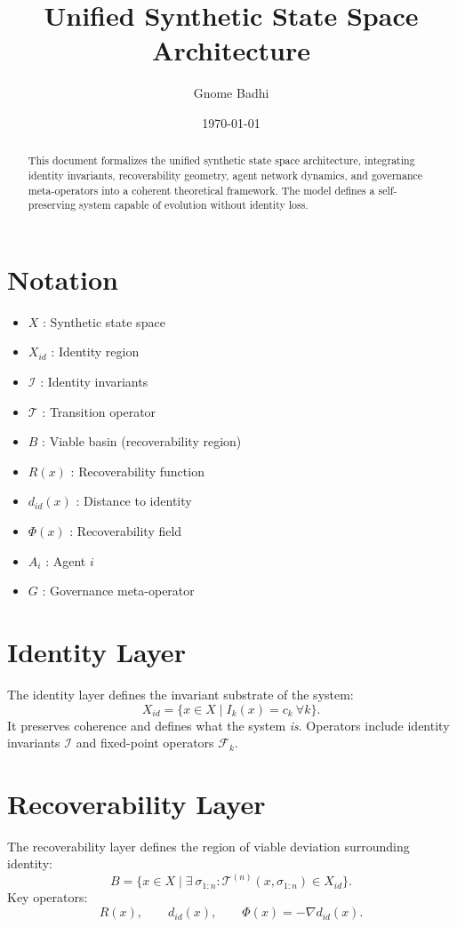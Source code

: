 \documentclass[12pt]{article}
\title{Unified Synthetic State Space Architecture}
\author{Gnome Badhi}
\date{\today}
\begin{document}
\maketitle

\begin{abstract}
This document formalizes the unified synthetic state space architecture, integrating identity invariants, recoverability geometry, agent network dynamics, and governance meta-operators into a coherent theoretical framework. The model defines a self-preserving system capable of evolution without identity loss.
\end{abstract}

\tableofcontents

\section{Notation}
\begin{itemize}
    \item $X$ : Synthetic state space
    \item $X_{id}$ : Identity region
    \item $\mathcal{I}$ : Identity invariants
    \item $\mathcal{T}$ : Transition operator
    \item $B$ : Viable basin (recoverability region)
    \item $R(x)$ : Recoverability function
    \item $d_{id}(x)$ : Distance to identity
    \item $\Phi(x)$ : Recoverability field
    \item $A_i$ : Agent $i$
    \item $G$ : Governance meta-operator
\end{itemize}

\section{Identity Layer}
The identity layer defines the invariant substrate of the system:
\[
X_{id} = \{x \in X \mid I_k(x) = c_k \ \forall k\}.
\]
It preserves coherence and defines what the system \emph{is}. Operators include identity invariants $\mathcal{I}$ and fixed-point operators $\mathcal{F}_k$.

\section{Recoverability Layer}
The recoverability layer defines the region of viable deviation surrounding identity:
\[
B = \{x \in X \mid \exists \ \sigma_{1:n} : \mathcal{T}^{(n)}(x,\sigma_{1:n}) \in X_{id}\}.
\]
Key operators:
\[
R(x), \qquad d_{id}(x), \qquad \Phi(x) = -\nabla d_{id}(x).
\]
\end{document}
